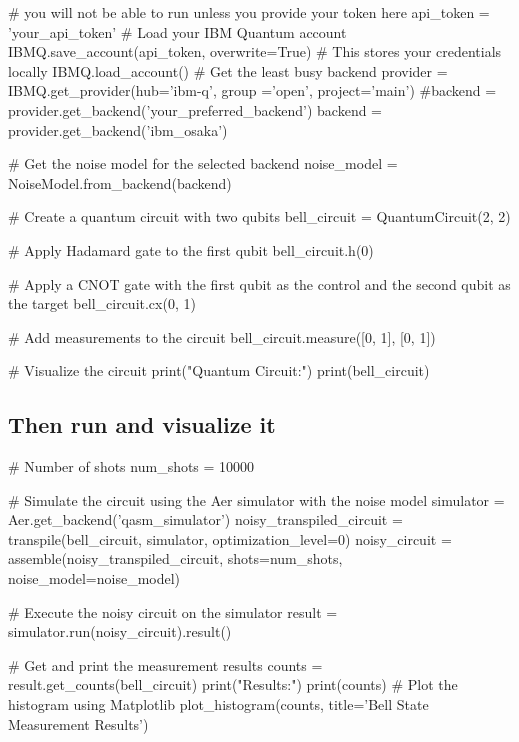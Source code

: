 \documentclass[%
oneside,                 %
final,                   %
10pt]{article}
\begin{document}
# you will not be able to run unless you provide your token here
api_token = 'your_api_token'
# Load your IBM Quantum account
IBMQ.save_account(api_token, overwrite=True)  # This stores your credentials locally
IBMQ.load_account()
# Get the least busy backend
provider = IBMQ.get_provider(hub='ibm-q', group ='open', project='main')
#backend = provider.get_backend('your_preferred_backend')
backend = provider.get_backend('ibm_osaka')

# Get the noise model for the selected backend
noise_model = NoiseModel.from_backend(backend)

# Create a quantum circuit with two qubits
bell_circuit = QuantumCircuit(2, 2)

# Apply Hadamard gate to the first qubit
bell_circuit.h(0)

# Apply a CNOT gate with the first qubit as the control and the second qubit as the target
bell_circuit.cx(0, 1)

# Add measurements to the circuit
bell_circuit.measure([0, 1], [0, 1])

# Visualize the circuit
print("Quantum Circuit:")
print(bell_circuit)

\epycod


\subsection{Then run and visualize it}


















\bpycod
# Number of shots
num_shots = 10000

# Simulate the circuit using the Aer simulator with the noise model
simulator = Aer.get_backend('qasm_simulator')
noisy_transpiled_circuit = transpile(bell_circuit, simulator, optimization_level=0)
noisy_circuit = assemble(noisy_transpiled_circuit, shots=num_shots, noise_model=noise_model)

# Execute the noisy circuit on the simulator
result = simulator.run(noisy_circuit).result()

# Get and print the measurement results
counts = result.get_counts(bell_circuit)
print("\nMeasurement Results:")
print(counts)
# Plot the histogram using Matplotlib
plot_histogram(counts, title='Bell State Measurement Results')
\end{document}
